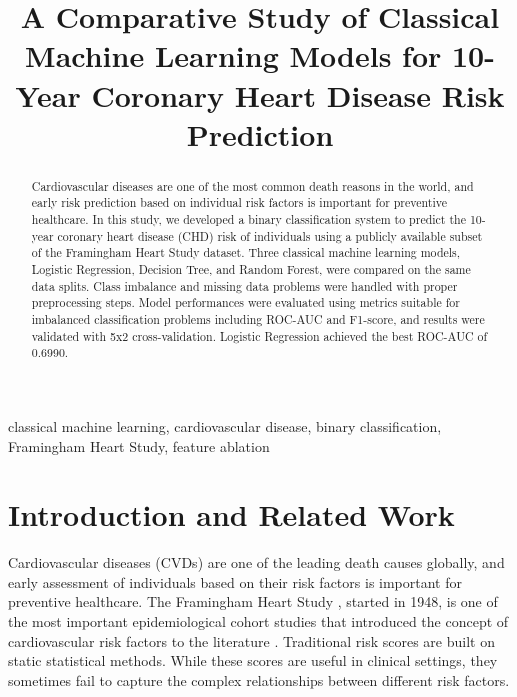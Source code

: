 \documentclass[conference]{IEEEtran}
\begin{document}
\title{A Comparative Study of Classical Machine Learning Models
for 10-Year Coronary Heart Disease Risk Prediction}

\author{
\and
{}
}

\maketitle

\begin{abstract}
Cardiovascular diseases are one of the most common death reasons in the world, and early risk prediction based on individual risk factors is important for preventive healthcare. In this study, we developed a binary classification system to predict the 10-year coronary heart disease (CHD) risk of individuals using a publicly available subset of the Framingham Heart Study dataset. Three classical machine learning models, Logistic Regression, Decision Tree, and Random Forest, were compared on the same data splits. Class imbalance and missing data problems were handled with proper preprocessing steps. Model performances were evaluated using metrics suitable for imbalanced classification problems including ROC-AUC and F1-score, and results were validated with 5x2 cross-validation. Logistic Regression achieved the best ROC-AUC of 0.6990.
\end{abstract}

\begin{IEEEkeywords}
classical machine learning, cardiovascular disease, binary classification, Framingham Heart Study, feature ablation
\end{IEEEkeywords}

\section{Introduction and Related Work}

Cardiovascular diseases (CVDs) are one of the leading death causes globally, and early assessment of individuals based on their risk factors is important for preventive healthcare. The Framingham Heart Study \cite{b1}, started in 1948, is one of the most important epidemiological cohort studies that introduced the concept of cardiovascular risk factors to the literature \cite{b4}. Traditional risk scores are built on static statistical methods. While these scores are useful in clinical settings, they sometimes fail to capture the complex relationships between different risk factors.
\end{document}
